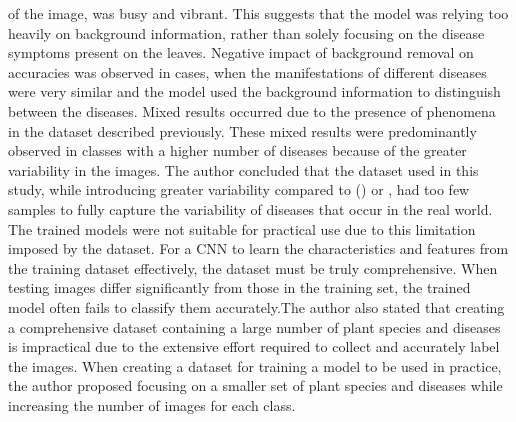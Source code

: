 \documentclass{BachelorBUI}
\begin{document}
of the image, was busy and vibrant. This suggests that the model was relying too heavily on background information, rather than solely focusing on the disease symptoms present on the leaves. Negative impact of background removal on accuracies was observed in cases, when the manifestations of different diseases were very similar and the model used the background information to distinguish between the diseases. Mixed results occurred due to the presence of phenomena in the dataset described previously. These mixed results were predominantly observed in classes with a higher number of diseases because of the greater variability in the images. The author concluded that the dataset used in this study, while introducing greater variability compared to  (\cite{Mohanty:2016}) or \cite{Ferentinos:2018}, had too few samples to fully capture the variability of diseases that occur in the real world. The trained models were not suitable for practical use due to this limitation imposed by the dataset. For a CNN to learn the characteristics and features from the training dataset effectively, the dataset must be truly comprehensive. When testing images differ significantly from those in the training set, the trained model often fails to classify them accurately.The author also stated that creating a comprehensive dataset containing a large number of plant species and diseases is impractical due to the extensive effort required to collect and accurately label the images. When creating a dataset for training a model to be used in practice, the author proposed focusing on a smaller set of plant species and diseases while increasing the number of images for each class. 
\end{document}
